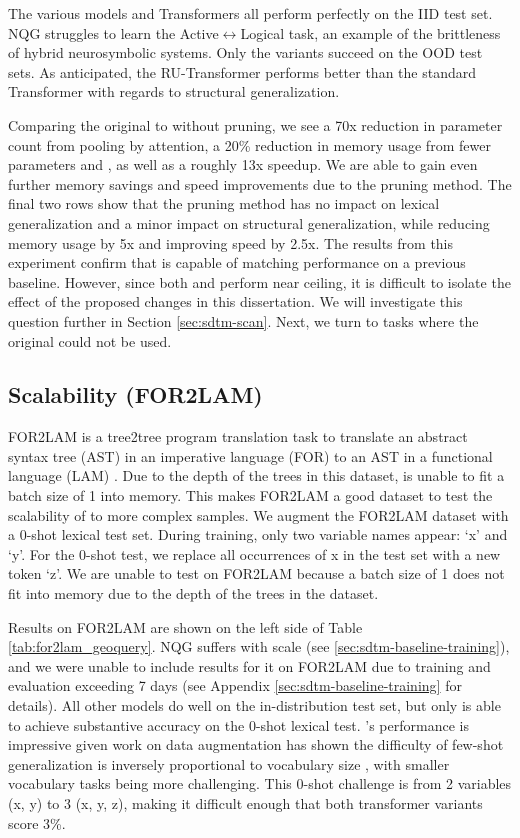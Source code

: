 The various \dtm models and Transformers all perform perfectly on the IID test set. NQG struggles to learn the Active$\leftrightarrow$Logical task, an example of the brittleness of hybrid neurosymbolic systems. Only the \dtm variants succeed on the OOD test sets. As anticipated, the RU-Transformer performs better than the standard Transformer with regards to structural generalization.

Comparing the original \dtm to \sdtm without pruning, we see a 70x reduction in parameter count from pooling by attention, a 20\% reduction in memory usage from fewer parameters and \abvrepname, as well as a roughly 13x speedup. We are able to gain even further memory savings and speed improvements due to the pruning method. The final two rows show that the pruning method has no impact on lexical generalization and a minor impact on structural generalization, while reducing memory usage by 5x and improving speed by 2.5x. The results from this experiment confirm that \sdtm is capable of matching \dtm performance on a previous baseline. However, since both \dtm and \sdtm perform near ceiling, it is difficult to isolate the effect of the proposed changes in this dissertation. We will investigate this question further in Section \ref{sec:sdtm-scan}. Next, we turn to tasks where the original \dtm could not be used.

\subsection{Scalability (FOR2LAM)}
FOR2LAM is a tree2tree program translation task to translate an abstract syntax tree (AST) in an imperative language (FOR) to an AST in a functional language (LAM) \citep{NEURIPS2018_d759175d}. Due to the depth of the trees in this dataset, \dtm is unable to fit a batch size of 1 into memory. This makes FOR2LAM a good dataset to test the scalability of \sdtm to more complex samples. We augment the FOR2LAM dataset with a 0-shot lexical test set. During training, only two variable names appear: `x' and `y'. For the 0-shot test, we replace all occurrences of x in the test set with a new token `z'. We are unable to test \dtm on FOR2LAM because a batch size of 1 does not fit into memory due to the depth of the trees in the dataset.


Results on FOR2LAM are shown on the left side of Table \ref{tab:for2lam_geoquery}. NQG suffers with scale (see \ref{sec:sdtm-baseline-training}), and we were unable to include results for it on FOR2LAM due to training and evaluation exceeding 7 days (see Appendix \ref{sec:sdtm-baseline-training} for details). All other models do well on the in-distribution test set, but only \dtm is able to achieve substantive accuracy on the 0-shot lexical test. \dtm's performance is impressive given work on data augmentation has shown the difficulty of few-shot generalization is inversely proportional to vocabulary size \citep{patel2022revisiting}, with smaller vocabulary tasks being more challenging. This 0-shot challenge is from 2 variables (x, y) to 3 (x, y, z), making it difficult enough that both transformer variants score 3\%.

